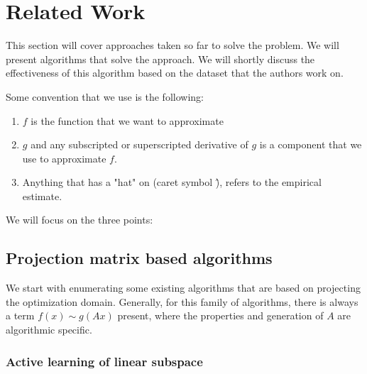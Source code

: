
\chapter{Related Work}

\ifpdf
    \graphicspath{{Chapter2/Figs/Raster/}{Chapter2/Figs/PDF/}{Chapter2/Figs/}}
\else
    \graphicspath{{Chapter2/Figs/Vector/}{Chapter2/Figs/}}
\fi

This section will cover approaches taken so far to solve the problem.
We will present algorithms that solve the approach.
We will shortly discuss the effectiveness of this algorithm based on the dataset that the authors work on.

Some convention that we use is the following:

\begin{enumerate}
\item $f$ is the function that we want to approximate
\item $g$ and any subscripted or superscripted derivative of $g$ is a component that we use to approximate $f$.
\item Anything that has a "hat" on (caret symbol \^ ), refers to the empirical estimate. 
\end{enumerate}

We will focus on the three points: 

\section{Projection matrix based algorithms}

We start with enumerating some existing algorithms that are based on projecting the optimization domain.
Generally, for this family of algorithms, there is always a term $f(x) \sim g(Ax)$ present, where the properties and generation of $A$ are algorithmic specific.

\subsection{Active learning of linear subspace}

